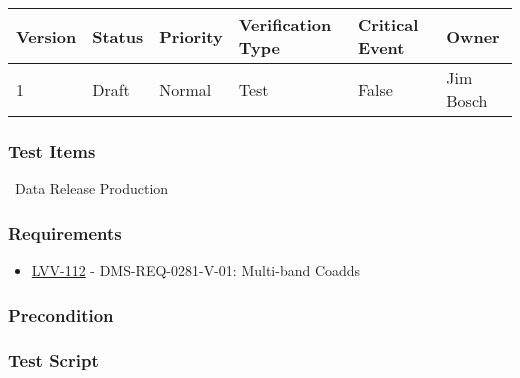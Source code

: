 \begin{longtable}[]{@{}llllll@{}}
\toprule
Version & Status & Priority & Verification Type & Critical Event &
Owner\tabularnewline
\midrule
\endhead
1 & Draft & Normal & Test & False & Jim Bosch\tabularnewline
\bottomrule
\end{longtable}

\hypertarget{test-items-51}{%
\subsubsection{Test Items}\label{test-items-51}}

~Data Release Production

\hypertarget{requirements-52}{%
\subsubsection{Requirements}\label{requirements-52}}

\begin{itemize}
\tightlist
\item
  \href{https://jira.lsstcorp.org/browse/LVV-112}{LVV-112} -
  DMS-REQ-0281-V-01: Multi-band Coadds
\end{itemize}

\hypertarget{precondition-7}{%
\subsubsection{Precondition}\label{precondition-7}}

\hypertarget{test-script-52}{%
\subsubsection{Test Script}\label{test-script-52}}

